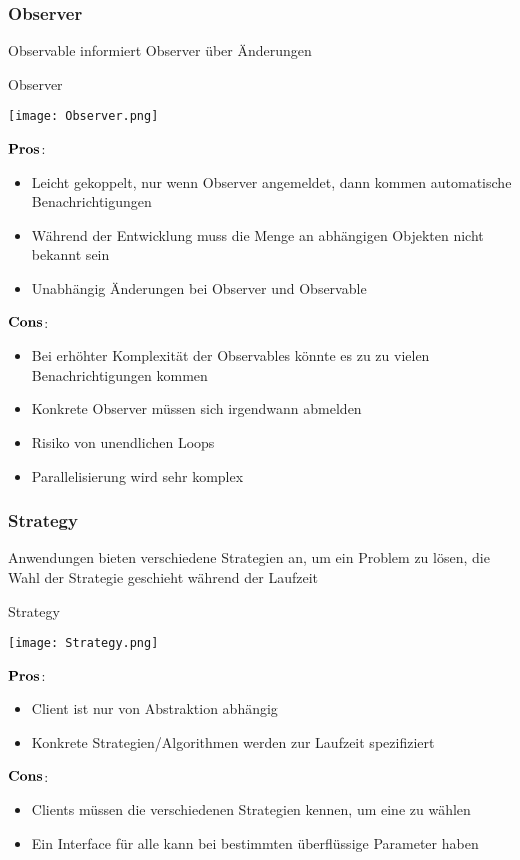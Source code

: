 \subsubsection{Observer}
Observable informiert Observer über Änderungen
\begin{table}[H]
\caption{Observer}
\texttt{[image: Observer.png]}	
\end{table}
\begin{multicols}{2}
$\bold{Pros}$:
\begin{itemize}
	\item Leicht gekoppelt, nur wenn Observer angemeldet, dann kommen automatische Benachrichtigungen
	\item Während der Entwicklung muss die Menge an abhängigen Objekten nicht bekannt sein
	\item Unabhängig Änderungen bei Observer und Observable 
\end{itemize}
\columnbreak
$\bold{Cons}$:
\begin{itemize}
	\item Bei erhöhter Komplexität der Observables könnte es zu zu vielen Benachrichtigungen kommen
	\item Konkrete Observer müssen sich irgendwann abmelden
	\item Risiko von unendlichen Loops
	\item Parallelisierung wird sehr komplex
\end{itemize}
\end{multicols}
\subsubsection{Strategy}
Anwendungen bieten verschiedene Strategien an, um ein Problem zu lösen, die Wahl der Strategie geschieht während der Laufzeit  
\begin{table}[H]
\caption{Strategy}
\texttt{[image: Strategy.png]}
\end{table}
\begin{multicols}{2}
$\bold{Pros}$:
\begin{itemize}
	\item Client ist nur von Abstraktion abhängig
	\item Konkrete Strategien/Algorithmen werden zur Laufzeit spezifiziert
\end{itemize}
\columnbreak
$\bold{Cons}$:
\begin{itemize}
	\item Clients müssen die verschiedenen Strategien kennen, um eine zu wählen
	\item Ein Interface für alle kann bei bestimmten überflüssige Parameter haben
\end{itemize}
\end{multicols}
